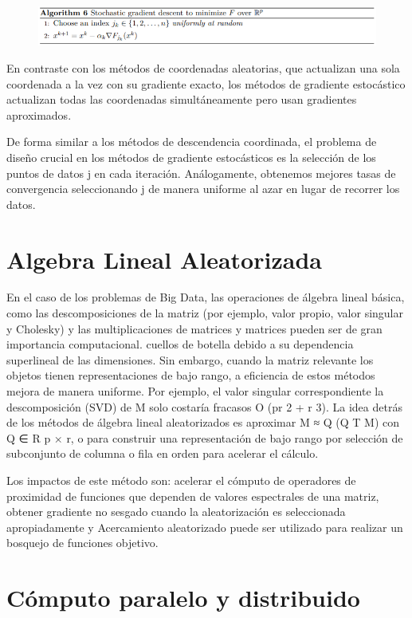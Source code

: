 \documentclass[]{article}
\begin{document}
\begin{figure}
\centering
\includegraphics{alg6.png}
\caption{}
\end{figure}

En contraste con los métodos de coordenadas aleatorias, que actualizan
una sola coordenada a la vez con su gradiente exacto, los métodos de
gradiente estocástico actualizan todas las coordenadas simultáneamente
pero usan gradientes aproximados.

De forma similar a los métodos de descendencia coordinada, el problema
de diseño crucial en los métodos de gradiente estocásticos es la
selección de los puntos de datos j en cada iteración. Análogamente,
obtenemos mejores tasas de convergencia seleccionando j de manera
uniforme al azar en lugar de recorrer los datos.

\section{Algebra Lineal Aleatorizada}\label{algebra-lineal-aleatorizada}

En el caso de los problemas de Big Data, las operaciones de álgebra
lineal básica, como las descomposiciones de la matriz (por ejemplo,
valor propio, valor singular y Cholesky) y las multiplicaciones de
matrices y matrices pueden ser de gran importancia computacional.
cuellos de botella debido a su dependencia superlineal de las
dimensiones. Sin embargo, cuando la matriz relevante los objetos tienen
representaciones de bajo rango, a eficiencia de estos métodos mejora de
manera uniforme. Por ejemplo, el valor singular correspondiente la
descomposición (SVD) de M solo costaría fracasos O (pr 2 + r 3). La idea
detrás de los métodos de álgebra lineal aleatorizados es aproximar M ≈ Q
(Q T M) con Q ∈ R p × r, o para construir una representación de bajo
rango por selección de subconjunto de columna o fila en orden para
acelerar el cálculo.

Los impactos de este método son: acelerar el cómputo de operadores de
proximidad de funciones que dependen de valores espectrales de una
matriz, obtener gradiente no sesgado cuando la aleatorización es
seleccionada apropiadamente y Acercamiento aleatorizado puede ser
utilizado para realizar un bosquejo de funciones objetivo.

\section{Cómputo paralelo y
distribuido}\label{computo-paralelo-y-distribuido}
\end{document}
